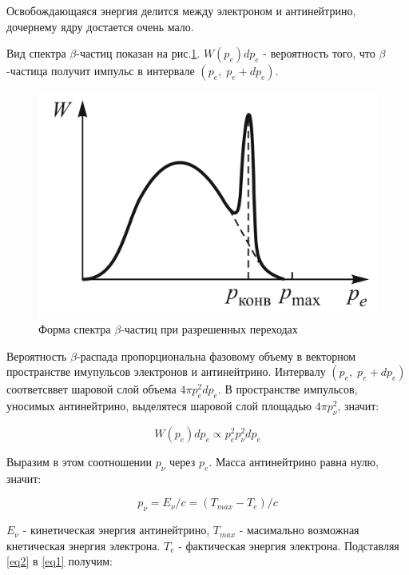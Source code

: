 \documentclass[a4paper]{article}
\begin{document}
Освобождающаяся энергия делится между электроном и антинейтрино, дочернему ядру достается очень мало.

Вид спектра $\beta$-частиц показан на рис.\ref{p1}. $W(p_e)dp_e$ - вероятность того, что $\beta$-частица получит импульс в интервале $(p_e, \; p_e+dp_e)$.

\begin{figure}
    \includegraphics[scale = 0.2]{p1.png}
    \caption{Форма спектра $\beta$-частиц при разрешенных переходах}
    \label{p1}
\end{figure}

Вероятность $\beta$-распада пропорциональна фазовому объему в векторном пространстве имупульсов
электронов и антинейтрино. Интервалу $(p_e, \; p_e+dp_e)$ соответсввет шаровой слой объема 
$4\pi p_e^2 dp_e$. В пространстве импульсов, уносимых антинейтрино, выделятеся шаровой слой 
площадью $4 \pi p_{\nu}^2$, значит:

\begin{equation}
    W(p_e) dp_e \propto p_e^2 p_{\nu}^2 dp_e 
    \label{eq1}
\end{equation}

Выразим в этом соотношении $p_{\nu}$ через $p_e$. Масса антинейтрино равна нулю, значит:

\begin{equation}
    p_{\nu} = E_{\nu} / c = (T_{max} - T_e)/c
    \label{eq2}
\end{equation}

$E_{\nu}$ - кинетическая энергия антинейтрино, $T_{max}$ - масимально возможная кнетическая энергия
электрона. $T_e$ - фактическая энергия электрона. Подставляя \ref{eq2} в \ref{eq1} получим:
\end{document}
